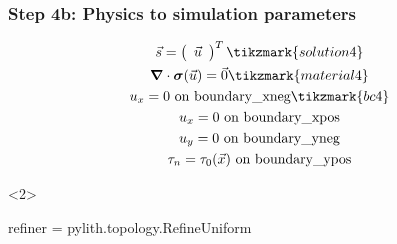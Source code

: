 \documentclass[aspectratio=169]{beamer}
\begin{document}
\begin{frame}[t,fragile]
  \frametitle{Step 4b: Physics to simulation parameters}
  \summary{}

  \begin{minipage}[t]{0.3\textwidth}
    {\scriptsize
    \begin{gather*}
        \vec{s} = \left(\begin{array}{c} \vec{u} \end{array}\right)^T \tikzmark{solution4}\\
        \tensor{\nabla} \cdot \tensor{\sigma}(\vec{u}) = \vec{0} \tikzmark{material4}\\
        u_x = 0 \text{ on boundary\_xneg} \tikzmark{bc4}\\
        u_x = 0 \text{ on boundary\_xpos} \\
        u_y = 0 \text{ on boundary\_yneg} \\
        \tau_n = \tau_0(\vec{x}) \text{ on boundary\_ypos}
    \end{gather*}}
  \end{minipage}
  \hfill
  \begin{minipage}[t]{0.67\textwidth}
    \begin{onlyenv}<2>
      \begin{cfgcode}
        refiner = pylith.topology.RefineUniform
      \end{cfgcode}
    \end{onlyenv}
  \end{minipage}

  
\end{frame}
\end{document}

